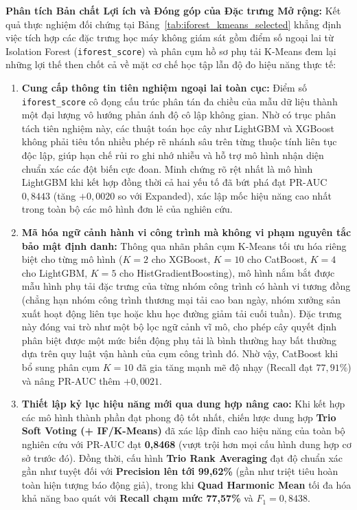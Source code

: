 \noindent\textbf{Phân tích Bản chất Lợi ích và Đóng góp của Đặc trưng Mở rộng:} Kết quả thực nghiệm đối chứng tại Bảng~\ref{tab:iforest_kmeans_selected} khẳng định việc tích hợp các đặc trưng học máy không giám sát gồm điểm số ngoại lai từ Isolation Forest (\texttt{iforest\_score}) và phân cụm hồ sơ phụ tải K-Means đem lại những lợi thế then chốt cả về mặt cơ chế học tập lẫn độ đo hiệu năng thực tế:
\begin{enumerate}
    \item \textbf{Cung cấp thông tin tiên nghiệm ngoại lai toàn cục:} Điểm số \texttt{iforest\_score} cô đọng cấu trúc phân tán đa chiều của mẫu dữ liệu thành một đại lượng vô hướng phản ánh độ cô lập không gian. Nhờ có trục phân tách tiên nghiệm này, các thuật toán học cây như LightGBM và XGBoost không phải tiêu tốn nhiều phép rẽ nhánh sâu trên từng thuộc tính liên tục độc lập, giúp hạn chế rủi ro ghi nhớ nhiễu và hỗ trợ mô hình nhận diện chuẩn xác các đột biến cực đoan. Minh chứng rõ rệt nhất là mô hình LightGBM khi kết hợp đồng thời cả hai yếu tố đã bứt phá đạt PR-AUC $0{,}8443$ (tăng $+0{,}0020$ so với Expanded), xác lập mốc hiệu năng cao nhất trong toàn bộ các mô hình đơn lẻ của nghiên cứu.
    \item \textbf{Mã hóa ngữ cảnh hành vi công trình mà không vi phạm nguyên tắc bảo mật định danh:} Thông qua nhãn phân cụm K-Means tối ưu hóa riêng biệt cho từng mô hình ($K=2$ cho XGBoost, $K=10$ cho CatBoost, $K=4$ cho LightGBM, $K=5$ cho HistGradientBoosting), mô hình nắm bắt được mẫu hình phụ tải đặc trưng của từng nhóm công trình có hành vi tương đồng (chẳng hạn nhóm công trình thương mại tải cao ban ngày, nhóm xưởng sản xuất hoạt động liên tục hoặc khu học đường giảm tải cuối tuần). Đặc trưng này đóng vai trò như một bộ lọc ngữ cảnh vĩ mô, cho phép cây quyết định phân biệt được một mức biến động phụ tải là bình thường hay bất thường dựa trên quy luật vận hành của cụm công trình đó. Nhờ vậy, CatBoost khi bổ sung phân cụm $K=10$ đã gia tăng mạnh mẽ độ nhạy (Recall đạt $77{,}91\%$) và nâng PR-AUC thêm $+0{,}0021$.
    \item \textbf{Thiết lập kỷ lục hiệu năng mới qua dung hợp nâng cao:} Khi kết hợp các mô hình thành phần đạt phong độ tốt nhất, chiến lược dung hợp \textbf{Trio Soft Voting (+ IF/K-Means)} đã xác lập đỉnh cao hiệu năng của toàn bộ nghiên cứu với PR-AUC đạt \textbf{0,8468} (vượt trội hơn mọi cấu hình dung hợp cơ sở trước đó). Đồng thời, cấu hình \textbf{Trio Rank Averaging} đạt độ chuẩn xác gần như tuyệt đối với \textbf{Precision lên tới 99,62\%} (gần như triệt tiêu hoàn toàn hiện tượng báo động giả), trong khi \textbf{Quad Harmonic Mean} tối đa hóa khả năng bao quát với \textbf{Recall chạm mức 77,57\%} và $F_1 = 0{,}8438$.
\end{enumerate}

